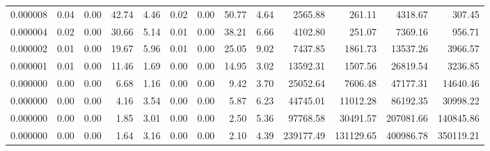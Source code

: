 \begin{tabular}{lrrrrrrrrrrrr}
0.000008 & 0.04 & 0.00 & 42.74 & 4.46 & 0.02 & 0.00 & 50.77 & 4.64 & 2565.88 & 261.11 & 4318.67 & 307.45 \\
0.000004 & 0.02 & 0.00 & 30.66 & 5.14 & 0.01 & 0.00 & 38.21 & 6.66 & 4102.80 & 251.07 & 7369.16 & 956.71 \\
0.000002 & 0.01 & 0.00 & 19.67 & 5.96 & 0.01 & 0.00 & 25.05 & 9.02 & 7437.85 & 1861.73 & 13537.26 & 3966.57 \\
0.000001 & 0.01 & 0.00 & 11.46 & 1.69 & 0.00 & 0.00 & 14.95 & 3.02 & 13592.31 & 1507.56 & 26819.54 & 3236.85 \\
0.000000 & 0.00 & 0.00 & 6.68 & 1.16 & 0.00 & 0.00 & 9.42 & 3.70 & 25052.64 & 7606.48 & 47177.31 & 14640.46 \\
0.000000 & 0.00 & 0.00 & 4.16 & 3.54 & 0.00 & 0.00 & 5.87 & 6.23 & 44745.01 & 11012.28 & 86192.35 & 30998.22 \\
0.000000 & 0.00 & 0.00 & 1.85 & 3.01 & 0.00 & 0.00 & 2.50 & 5.36 & 97768.58 & 30491.57 & 207081.66 & 140845.86 \\
0.000000 & 0.00 & 0.00 & 1.64 & 3.16 & 0.00 & 0.00 & 2.10 & 4.39 & 239177.49 & 131129.65 & 400986.78 & 350119.21 \\
\bottomrule
\end{tabular}
